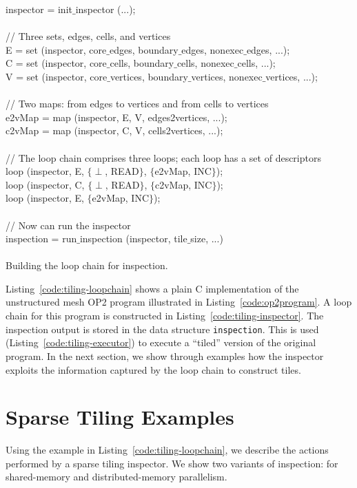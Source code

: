 \begin{algorithm}
\scriptsize\ttfamily
{}
inspector = init$\_$inspector (...);\\
~\\
// Three sets, edges, cells, and vertices\\
E = set (inspector, core$\_$edges, boundary$\_$edges, nonexec$\_$edges, ...);\\
C = set (inspector, core$\_$cells, boundary$\_$cells, nonexec$\_$cells, ...);\\
V = set (inspector, core$\_$vertices, boundary$\_$vertices, nonexec$\_$vertices, ...);\\ 
~\\
// Two maps: from edges to vertices and from cells to vertices\\
e2vMap = map (inspector, E, V, edges2vertices, ...);\\
c2vMap = map (inspector, C, V, cells2vertices, ...);\\
~\\
// The loop chain comprises three loops; each loop has a set of descriptors\\
loop (inspector, E, $\lbrace \perp$, READ$\rbrace$, $\lbrace$e2vMap, INC$\rbrace$);\\
loop (inspector, C, $\lbrace \perp$, READ$\rbrace$, $\lbrace$c2vMap, INC$\rbrace$);\\
loop (inspector, E, $\lbrace$e2vMap, INC$\rbrace$); \\
~\\
// Now can run the inspector\\
inspection = run$\_$inspection (inspector, tile$\_$size, ...)\\
~\\
\caption{Building the loop chain for inspection.}
\label{code:tiling-inspector}
\end{algorithm}


Listing~\ref{code:tiling-loopchain} shows a plain C implementation of the unstructured mesh OP2 program illustrated in Listing~\ref{code:op2program}. A loop chain for this program is constructed in Listing~\ref{code:tiling-inspector}. The inspection output is stored in the data structure \texttt{inspection}. This is used (Listing~\ref{code:tiling-executor}) to execute a ``tiled'' version of the original program. In the next section, we show through examples how the inspector exploits the information captured by the loop chain to construct tiles.


\section{Sparse Tiling Examples}
Using the example in Listing~\ref{code:tiling-loopchain}, we describe the actions performed by a sparse tiling inspector. We show two variants of inspection: for shared-memory and distributed-memory parallelism. 

